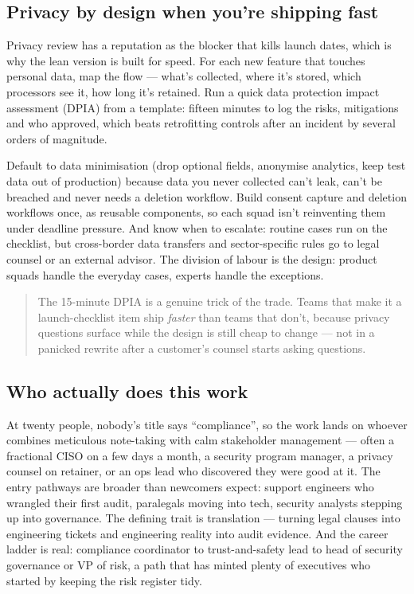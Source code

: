 \subsection{Privacy by design when you're shipping fast}


Privacy review has a reputation as the blocker that kills launch dates, which is why the lean version is built for speed. For each new feature that touches personal data, map the flow — what's collected, where it's stored, which processors see it, how long it's retained. Run a quick data protection impact assessment (DPIA) from a template: fifteen minutes to log the risks, mitigations and who approved, which beats retrofitting controls after an incident by several orders of magnitude.


Default to data minimisation (drop optional fields, anonymise analytics, keep test data out of production) because data you never collected can't leak, can't be breached and never needs a deletion workflow. Build consent capture and deletion workflows once, as reusable components, so each squad isn't reinventing them under deadline pressure. And know when to escalate: routine cases run on the checklist, but cross-border data transfers and sector-specific rules go to legal counsel or an external advisor. The division of labour is the design: product squads handle the everyday cases, experts handle the exceptions.



\begin{quote}\small
The 15-minute DPIA is a genuine trick of the trade. Teams that make it a launch-checklist item ship \emph{faster} than teams that don't, because privacy questions surface while the design is still cheap to change — not in a panicked rewrite after a customer's counsel starts asking questions.
\end{quote}



\subsection{Who actually does this work}


At twenty people, nobody's title says ``compliance'', so the work lands on whoever combines meticulous note-taking with calm stakeholder management — often a fractional CISO on a few days a month, a security program manager, a privacy counsel on retainer, or an ops lead who discovered they were good at it. The entry pathways are broader than newcomers expect: support engineers who wrangled their first audit, paralegals moving into tech, security analysts stepping up into governance. The defining trait is translation — turning legal clauses into engineering tickets and engineering reality into audit evidence. And the career ladder is real: compliance coordinator to trust-and-safety lead to head of security governance or VP of risk, a path that has minted plenty of executives who started by keeping the risk register tidy.



